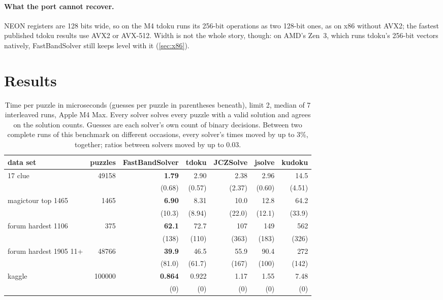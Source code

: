 \documentclass[11pt]{article}
\theoremstyle{definition}
\theoremstyle{plain}
\begin{document}
\paragraph{What the port cannot recover.} NEON registers are 128 bits wide, so on the M4 tdoku runs its 256-bit
operations as two 128-bit ones, as on x86 without AVX2; the fastest published tdoku results use AVX2 or AVX-512. Width is not the whole story,
though: on AMD's Zen~3, which runs tdoku's 256-bit vectors natively, FastBandSolver still keeps level with it
(\cref{sec:x86}).


\section{Results}
\label{sec:results}

\begin{table}[t]
\centering
\caption{Time per puzzle in microseconds (guesses per puzzle in parentheses beneath), limit 2, median of 7 interleaved runs, Apple M4 Max.
Every solver solves every puzzle with a valid solution and agrees on the solution counts. Guesses are each solver's
own count of binary decisions. Between two complete runs of this benchmark on different occasions, every solver's
times moved by up to 3\%, together; ratios between solvers moved by up to 0.03.}
\label{tab:sota}
\small
\setlength{\tabcolsep}{4pt}
\begin{tabular}{lrrrrrr}
\toprule
data set & puzzles & FastBandSolver & tdoku & JCZSolve & jsolve & kudoku \\
\midrule
17 clue & 49158 & \textbf{1.79} & 2.90 & 2.38 & 2.96 & 14.5 \\
&& (0.68) & (0.57) & (2.37) & (0.60) & (4.51) \\[2pt]
magictour top 1465 & 1465 & \textbf{6.90} & 8.31 & 10.0 & 12.8 & 64.2 \\
&& (10.3) & (8.94) & (22.0) & (12.1) & (33.9) \\[2pt]
forum hardest 1106 & 375 & \textbf{62.1} & 72.7 & 107 & 149 & 562 \\
&& (138) & (110) & (363) & (183) & (326) \\[2pt]
forum hardest 1905 11+ & 48766 & \textbf{39.9} & 46.5 & 55.9 & 90.4 & 272 \\
&& (81.0) & (61.7) & (167) & (100) & (142) \\[2pt]
kaggle & 100000 & \textbf{0.864} & 0.922 & 1.17 & 1.55 & 7.48 \\
&& (0) & (0) & (0) & (0) & (0) \\[2pt]
\bottomrule
\end{tabular}
\end{table}
\end{document}
